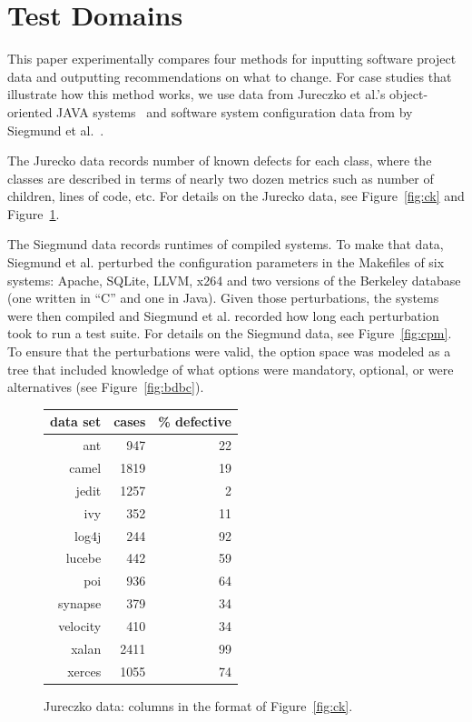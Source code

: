 \documentclass{sig-alternate}
\newcommand{\fig}[1]{Figure~\ref{fig:#1}}
\begin{document}
\section{Test Domains}
 This paper experimentally compares four methods for inputting software project data and outputting
 recommendations on what to change. For case studies that illustrate how this method works, we use data from Jureczko et al.'s object-oriented JAVA systems~\cite{jureczko10}  and
  software system   configuration data from by  Siegmund et al.~\cite{sven12}.
  
   The Jurecko data records number of known defects for each class, where the classes are described in terms of
  nearly two dozen metrics such as number of children, lines of code, etc.
For details on the Jurecko data, see  \fig{ck} and \fig{jd}.
 
  The Siegmund data records  runtimes of compiled systems. To make that data, Siegmund et al. perturbed
  the configuration parameters in the Makefiles of six systems: Apache, SQLite, LLVM, x264 and two versions of the
  Berkeley database (one written in ``C'' and one in Java). 
  Given those perturbations, the systems were then compiled and 
  Siegmund et al. recorded how long each perturbation took to run a test suite. For details on the Siegmund  data, see \fig{cpm}.
  To ensure that the perturbations
  were valid, the option space was modeled as a tree that included knowledge of what
  options were mandatory, optional, or were alternatives (see \fig{bdbc}).
  


 \begin{figure}
 \scriptsize
 \begin{center}
 \begin{tabular}{r|rr}
 data set & cases & \% defective\\\hline
  ant &947& 22\\
  camel& 1819& 19\\
 jedit& 1257& 2\\
 ivy &352& 11\\
 log4j& 244 &92\\
 lucebe &442 &59\\
 poi& 936 &64\\
 synapse &379 &34\\
 velocity& 410& 34\\
 xalan& 2411& 99\\
 xerces &1055& 74
 \end{tabular}
 \end{center}
 \caption{ Jureczko data: columns in the format of \fig{ck}.}\label{fig:jd}
 \end{figure}
 
\end{document}
